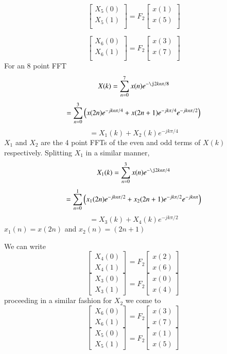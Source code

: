\documentclass[journal,12pt,twocolumn]{IEEEtran}
\renewcommand\thesection{\arabic{section}}
\begin{document}
\begin{enumerate}[label=\thesection.\arabic*]
\begin{equation}
\begin{bmatrix}
X_{5}(0) \\ 
X_{5}(1)\\ 
\end{bmatrix}
= F_{2}
\begin{bmatrix}
x(1) \\ 
x(5) \\ 
\end{bmatrix}
\end{equation}

\begin{equation}
\begin{bmatrix}
X_{6}(0) \\ 
X_{6}(1)\\ 
\end{bmatrix}
= F_{2}
\begin{bmatrix}
x(3) \\ 
x(7) \\ 
\end{bmatrix}
\end{equation}
\solution
For an 8 point FFT
\[X(k) = \sum_{n=0}^{7}x(n)e^{-\j2kn\pi/8}\]
\[=\sum_{n=0}^3\left(x(2n)e^{-jkn\pi/4} + x(2n+1)e^{-jk\pi/4}e^{-jkn\pi/2}\right) \]
\[=X_1(k) + X_2(k)e^{-jk\pi/4}\]
$X_1$ and $X_2$ are the 4 point FFTs of the even and odd terms of $X(k)$ respectively.
Splitting $X_1$ in a similar manner,
\[X_1(k) = \sum_{n=0}^{3}x(n)e^{-\j2kn\pi/4}\]
\[=\sum_{n=0}^1\left(x_1(2n)e^{-jkn\pi/2} + x_2(2n+1)e^{-jk\pi/2}e^{-jkn\pi}\right) \]
\[=X_3(k) + X_4(k)e^{-jk\pi/2}\]
$x_1(n) = x(2n)$ and $x_2(n)=(2n+1)$

We can write
\[
\begin{bmatrix}
    X_4(0)\\
    X_4(1)
\end{bmatrix}
=
F_2
\begin{bmatrix}
    x(2)\\
    x(6)
\end{bmatrix}
\]
\[
\begin{bmatrix}
    X_3(0)\\
    X_3(1)
\end{bmatrix}
=
F_2
\begin{bmatrix}
    x(0)\\
    x(4)
\end{bmatrix}
\]
proceeding in a similar fashion for $X_2$ we come to
\[
\begin{bmatrix}
    X_6(0)\\
    X_6(1)
\end{bmatrix}
=
F_2
\begin{bmatrix}
    x(3)\\
    x(7)
\end{bmatrix}
\]
\[
\begin{bmatrix}
    X_5(0)\\
    X_5(1)
\end{bmatrix}
=
F_2
\begin{bmatrix}
    x(1)\\
    x(5)
\end{bmatrix}
\]


\end{enumerate}
\end{document}
